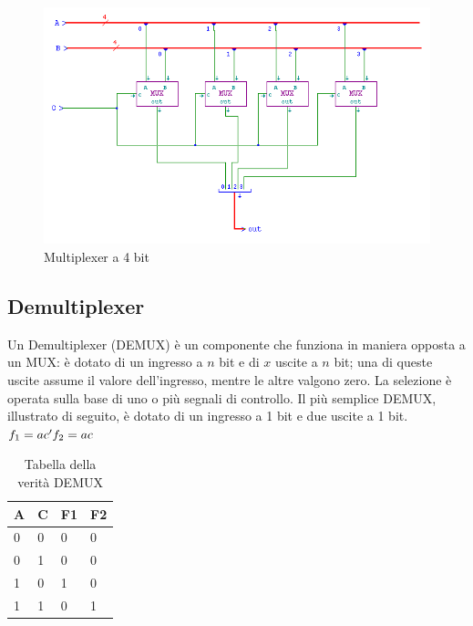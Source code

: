 \documentclass[10pt]{article}
\begin{document}
\begin{itemize}
\begin{figure}[H]
    \begin{minipage}[b]{\textwidth}
        \centering
        \includegraphics[width=\textwidth]{mux4}
        \caption{Multiplexer a 4 bit}
        \label{ }
    \end{minipage}
\end{figure}

\subsection{Demultiplexer}
Un Demultiplexer (DEMUX) è un componente che funziona in maniera opposta a un MUX: è dotato di un ingresso a $n$ bit e di $x$ uscite a $n$ bit; una di queste uscite assume il valore dell'ingresso,
mentre le altre valgono zero. La selezione è operata sulla base di uno o più segnali di controllo.
Il più semplice DEMUX, illustrato di seguito, è dotato di un ingresso a 1 bit e due uscite a 1 bit.
\\
$f_1 = ac'\\
f_2 = ac$
\\
\begin{table}[H]
    \begin{minipage}[b]{\textwidth}
    \centering
        \begin{tabular}{|ll|ll|}
        \hline
        \textbf{A} & \textbf{C} & \textbf{F1} & \textbf{F2} \\ \hline
        0          & 0          & 0           & 0           \\ 
        0          & 1          & 0           & 0           \\ 
        1          & 0          & 1           & 0          \\ 
        1          & 1          & 0           & 1           \\ \hline
        \end{tabular}
        \caption{Tabella della verità DEMUX}
        \label{tab:my-table}
    \end{minipage}
    \end{table}
    

\end{itemize}
\end{document}
